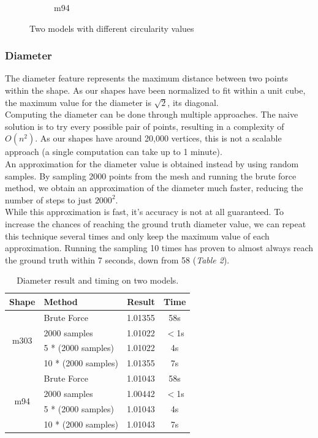 \documentclass{bigdata}
\begin{document}
\begin{figure}[h!]
\begin{subfigure}[b]{0.35\linewidth}
		\caption{m94}
	\end{subfigure}
	\caption{Two models with different circularity values}
	\label{fig:circularity}
\end{figure}
\newpage
\subsubsection{Diameter}
The diameter feature represents the maximum distance between two points within the shape. As our shapes have been normalized to fit within a unit cube, the maximum value for the diameter is $\sqrt{2}$, its diagonal. \\
Computing the diameter can be done through multiple approaches. The naive solution is to try every possible pair of points, resulting in a complexity of $O(n^2)$. As our shapes have around 20,000 vertices, this is not a scalable approach (a single computation can take up to 1 minute). \\
An approximation for the diameter value is obtained instead by using random samples. By sampling 2000 points from the mesh and running the brute force method, we obtain an approximation of the diameter much faster, reducing the number of steps to just $2000^2$. \\
While this approximation is fast, it's accuracy is not at all guaranteed. To increase the chances of reaching the ground truth diameter value, we can repeat this technique several times and only keep the maximum value of each approximation. Running the sampling 10 times has proven to almost always reach the ground truth within 7 seconds, down from 58 (\textit{Table 2}).

\begin{table}[h!]
	\begin{center}
		\begin{tabular}{c|l|c|c} %
			\textbf{Shape} & \textbf{Method} & \textbf{Result} & \textbf{Time} \\
			\hline
\multirow{4}{3em}{m303}& Brute Force & 1.01355 & 58s\\
				  & 2000 samples & 1.01022 & $<$1s\\
				  & 5 * (2000 samples) & 1.01022 & 4s\\
				  & 10 * (2000 samples) & 1.01355 & 7s\\
			\hline
\multirow{4}{3em}{m94}& Brute Force & 1.01043 & 58s\\
				  & 2000 samples & 1.00442 & $<$1s\\
				  & 5 * (2000 samples) & 1.01043 & 4s\\
				  & 10 * (2000 samples) & 1.01043 & 7s
		\end{tabular}
	\end{center}
	\caption{Diameter result and timing on two models.}
	\label{Table 2,}
\end{table}
\end{document}
